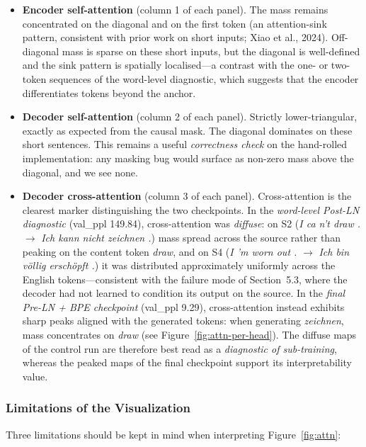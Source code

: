 \begin{itemize}
\item \textbf{Encoder self-attention} (column 1 of each panel). The mass remains concentrated on the diagonal and on the first token (an attention-sink pattern, consistent with prior work on short inputs; Xiao et al., 2024). Off-diagonal mass is sparse on these short inputs, but the diagonal is well-defined and the sink pattern is spatially localised---a contrast with the one- or two-token sequences of the word-level diagnostic, which suggests that the encoder differentiates tokens beyond the anchor.

\item \textbf{Decoder self-attention} (column 2 of each panel). Strictly lower-triangular, exactly as expected from the causal mask. The diagonal dominates on these short sentences. This remains a useful \textit{correctness check} on the hand-rolled implementation: any masking bug would surface as non-zero mass above the diagonal, and we see none.

\item \textbf{Decoder cross-attention} (column 3 of each panel). Cross-attention is the clearest marker distinguishing the two checkpoints. In the \textit{word-level Post-LN diagnostic} (val\_ppl 149.84), cross-attention was \textit{diffuse}: on S2 (\textit{I ca n't draw .} $\rightarrow$ \textit{Ich kann nicht zeichnen .}) mass spread across the source rather than peaking on the content token \textit{draw}, and on S4 (\textit{I 'm worn out .} $\rightarrow$ \textit{Ich bin v\"ollig ersch\"opft .}) it was distributed approximately uniformly across the English tokens---consistent with the failure mode of Section~5.3, where the decoder had not learned to condition its output on the source. In the \textit{final Pre-LN + BPE checkpoint} (val\_ppl 9.29), cross-attention instead exhibits sharp peaks aligned with the generated tokens: when generating \textit{zeichnen}, mass concentrates on \textit{draw} (see Figure~\ref{fig:attn-per-head}). The diffuse maps of the control run are therefore best read as a \textit{diagnostic of sub-training}, whereas the peaked maps of the final checkpoint support its interpretability value.
\end{itemize}

\subsubsection{Limitations of the Visualization}

Three limitations should be kept in mind when interpreting Figure~\ref{fig:attn}:

